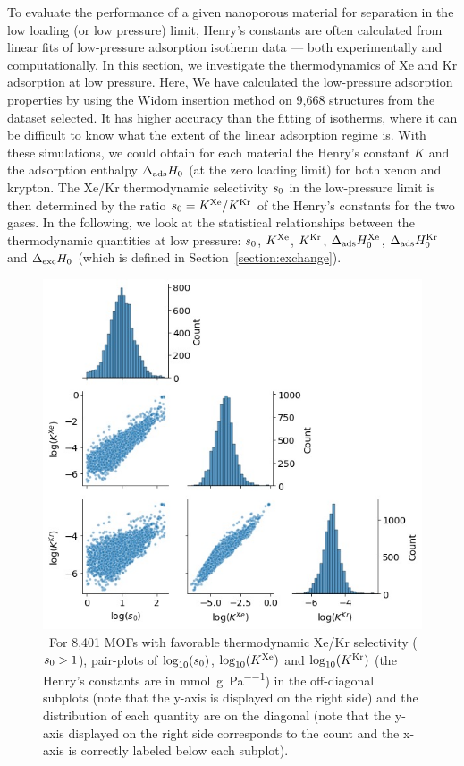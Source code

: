 \documentclass[main]{subfiles}
\begin{document}
To evaluate the performance of a given nanoporous material for separation in the low loading (or low pressure) limit, Henry's constants are often calculated from linear fits of low-pressure adsorption isotherm data --- both experimentally and computationally. In this section, we investigate the thermodynamics of Xe and Kr adsorption at low pressure. Here, We have calculated the low-pressure adsorption properties by using the Widom insertion method\cite{Widom1963, frenkel2001widom} on 9,668 structures from the dataset selected. It has higher accuracy than the fitting of isotherms, where it can be difficult to know what the extent of the linear adsorption regime is. With these simulations, we could obtain for each material the Henry's constant $K$ and the adsorption enthalpy $\Delta_{\text{ads}}H_{\text{0}}$ (at the zero loading limit) for both xenon and krypton. The Xe/Kr thermodynamic selectivity $s_{\text{0}}$ in the low-pressure limit is then determined by the ratio $s_{\text{0}} = K^{\text{Xe}}/K^{\text{Kr}}$ of the Henry's constants for the two gases. In the following, we look at the statistical relationships between the thermodynamic quantities at low pressure: $s_{\text{0}}$, $K^{\text{Xe}}$, $K^{\text{Kr}}$, $\Delta_{\text{ads}}H_{\text{0}}^{\text{Xe}}$, $\Delta_{\text{ads}}H_{\text{0}}^{\text{Kr}}$ and $\Delta_{\text{exc}}H_{\text{0}}$ (which is defined in Section~\ref{section:exchange}).


\begin{figure}[t]
\centering
  \includegraphics[width=\linewidth]{figures/2-thermo/Henry_0.jpg}
  \caption{\ For 8,401 MOFs with favorable thermodynamic Xe/Kr selectivity ($s_{\text{0}} > 1$), pair-plots of $\log_{\text{10}}(s_{\text{0}})$, $\log_{\text{10}}(K^{\text{Xe}})$ and $\log_{\text{10}}(K^{\text{Kr}})$ (the Henry's constants are in \si{\milli\mol\per\gram\per\pascal}) in the off-diagonal subplots (note that the y-axis is displayed on the right side) and the distribution of each quantity are on the diagonal (note that the y-axis displayed on the right side corresponds to the count and the x-axis is correctly labeled below each subplot).}
  \label{fgr:histo_K}
\end{figure}
\end{document}
